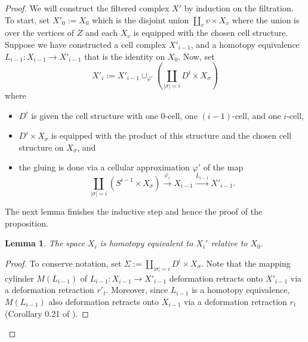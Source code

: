 \documentclass[11pt,letterpaper]{amsart}
\newtheorem{lemma}[theorem]{Lemma}
\newtheorem*{remark}{Remark}
\begin{document}
\begin{proof}
We will construct the filtered complex $X'$ by induction on the filtration. To start, set $X'_0:=X_0$ which is the disjoint union $\coprod_v v\times X_v$ where the union is over the vertices of $Z$ and each $X_v$ is equipped with the chosen cell structure. Suppose we have constructed a cell complex $X'_{i-1}$, and a homotopy equivalence $L_{i-1}:X_{i-1}\rightarrow X'_{i-1}$ that is the identity on $X_0$. %
Now, set
$$
X'_i:=X'_{i-1}\cup_{\varphi'}\left(\coprod_{|\sigma|=i}D^i\times X_{\sigma}\right)
$$
where %
\begin{itemize}
\item 
$D^i$ is given the cell structure with one $0$-cell, one $(i-1)$-cell, and one $i$-cell, 
\item 
$D^i\times X_{\sigma}$ is equipped with the product of this structure and the chosen cell structure on $X_{\sigma}$, and
\item 
the gluing is done via a cellular approximation $\varphi'$ of the map 
$$
\coprod_{|\sigma|=i}(S^{i-1}\times X_{\sigma})\stackrel{\varphi_i}\longrightarrow X_{i-1}\stackrel{L_{i-1}}\longrightarrow X'_{i-1}.
$$
\end{itemize}
The next lemma finishes the inductive step and hence the proof of the proposition. 
\begin{lemma}
\label{homotopyeq}
The space $X_i$ is homotopy equivalent to $X_i'$ relative to $X_0$.%
\end{lemma}
\begin{proof}
To conserve notation, set $\Sigma:=\coprod_{|\sigma|=i}D^i\times X_{\sigma}$. Note that the mapping cylinder $M(L_{i-1})$ of $L_{i-1}:X_{i-1}\rightarrow X'_{i-1}$ deformation retracts onto $X'_{i-1}$ via a deformation retraction $r'_t$. Moreover, since $L_{i-1}$ is a homotopy equivalence, $M(L_{i-1})$ also deformation retracts onto $X_{i-1}$ via a deformation retraction $r_t$ (Corollary 0.21 of \cite{hatcherbook}). %

\end{proof}
\end{proof}
\end{document}
